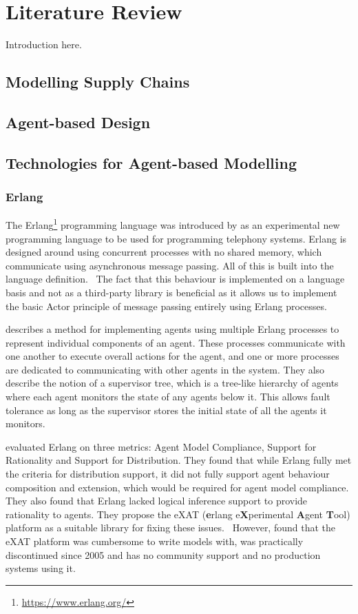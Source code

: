 \section{Literature Review}

Introduction here.

\subsection{Modelling Supply Chains}

\subsection{Agent-based Design}

\subsection{Technologies for Agent-based Modelling}

\subsubsection{Erlang}

The Erlang\footnote{\url{https://www.erlang.org/}} programming language was introduced by  as an experimental new programming language to be used for programming telephony systems.
Erlang is designed around using concurrent processes with no shared memory, which communicate using asynchronous message passing.
All of this is built into the language definition.~\cite{armstrong2007history}
The fact that this behaviour is implemented on a language basis and not as a third-party library is beneficial as it allows us to implement the basic Actor principle of message passing entirely using Erlang processes.

 describes a method for implementing agents using multiple Erlang processes to represent individual components of an agent.
These processes communicate with one another to execute overall actions for the agent, and one or more processes are dedicated to communicating with other agents in the system.
They also describe the notion of a supervisor tree, which is a tree-like hierarchy of agents where each agent monitors the state of any agents below it.
This allows fault tolerance as long as the supervisor stores the initial state of all the agents it monitors.

 evaluated Erlang on three metrics: Agent Model Compliance, Support for Rationality and Support for Distribution.
They found that while Erlang fully met the criteria for distribution support, it did not fully support agent behaviour composition and extension, which would be required for agent model compliance.
They also found that Erlang lacked logical inference support to provide rationality to agents.
They propose the eXAT (\textbf{e}rlang e\textbf{X}perimental \textbf{A}gent \textbf{T}ool) platform as a suitable library for fixing these issues.~\cite{di2003exat}
However,  found that the eXAT platform was cumbersome to write models with, was practically discontinued since 2005 and has no community support and no production systems using it.

